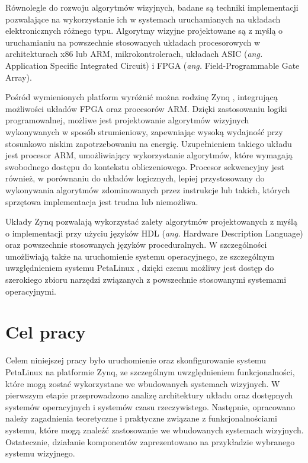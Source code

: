 Równolegle do rozwoju algorytmów wizyjnych, badane są techniki implementacji pozwalające na wykorzystanie ich w systemach uruchamianych na układach elektronicznych różnego typu. 
Algorytmy wizyjne projektowane są z myślą o uruchamianiu na powszechnie stosowanych układach procesorowych w architekturach x86 lub ARM, mikrokontrolerach, układach ASIC (\emph{ang.} Application Specific Integrated Circuit) i FPGA (\emph{ang.} Field-Programmable Gate Array).

Pośród wymienionych platform wyróżnić można rodzinę Zynq \cite{zybo-reference-manual}, integrującą możliwości układów FPGA oraz procesorów ARM. 
Dzięki zastosowaniu logiki programowalnej, możliwe jest projektowanie algorytmów wizyjnych wykonywanych w sposób strumieniowy, zapewniając wysoką wydajność przy stosunkowo niskim zapotrzebowaniu na energię.
Uzupełnieniem takiego układu jest procesor ARM, umożliwiający wykorzystanie algorytmów, które wymagają swobodnego dostępu do kontekstu obliczeniowego. 
Procesor sekwencyjny jest również, w porównaniu do układów logicznych, lepiej przystosowany do wykonywania algorytmów zdominowanych przez instrukcje lub takich, których sprzętowa implementacja jest trudna lub niemożliwa.

Układy Zynq pozwalają wykorzystać zalety algorytmów projektowanych z myślą o implementacji przy użyciu języków HDL (\emph{ang.} Hardware Description Language) oraz powszechnie stosowanych języków proceduralnych. 
W szczególności umożliwiają także na uruchomienie systemu operacyjnego, ze szczególnym uwzględnieniem systemu PetaLinux \cite{petalinux-tools}, dzięki czemu możliwy jest dostęp do szerokiego zbioru narzędzi związanych z powszechnie stosowanymi systemami operacyjnymi.

\section{Cel pracy}

Celem niniejszej pracy było uruchomienie oraz skonfigurowanie systemu PetaLinux na platformie Zynq, ze szczególnym uwzględnieniem funkcjonalności, które mogą zostać wykorzystane we wbudowanych systemach wizyjnych.
W pierwszym etapie przeprowadzono analizę architektury układu oraz dostępnych systemów operacyjnych i systemów czasu rzeczywistego. 
Następnie, opracowano należy zagadnienia teoretyczne i praktyczne związane z funkcjonalnościami systemu, które mogą znaleźć zastosowanie we wbudowanych systemach wizyjnych. 
Ostatecznie, działanie komponentów zaprezentowano na przykładzie wybranego systemu wizyjnego.

